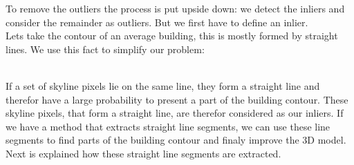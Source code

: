 \documentclass[10pt]{article}
\begin{document}

	To remove the outliers the process is put upside down: we detect the
	inliers and consider the remainder as outliers. But we first have to define an inlier.\\
	Lets take the contour of an average building, this is mostly formed by
	straight lines. We use this fact to simplify our problem:\\
	\\

	If a set of skyline pixels lie on the same line, they form a straight line
	and therefor have a large probability to present a part of the building contour.
	These skyline pixels, that form a straight line, are therefor considered as our
	inliers. 
	If we have a method that extracts straight line segments, we can use these
	line segments to find parts of the building contour and finaly improve the 3D
	model. Next is explained how these straight line segments are extracted.
\end{document}
